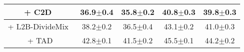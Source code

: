 \begin{table}[ht]
\begin{tabular}{c|cc|cc}
+ C2D~\cite{zheltonozhskii2022contrast}     & \multicolumn{1}{c}{36.9$\pm$0.4}   &35.8$\pm$0.2    & \multicolumn{1}{c}{40.8$\pm$0.3}   & 39.8$\pm$0.3    \\ \midrule
+ L2B-DivideMix~\cite{zhou2024l2b}          & \multicolumn{1}{c}{38.2$\pm$0.2}   &36.5$\pm$0.4    & \multicolumn{1}{c}{43.1$\pm$0.2}   & 41.0$\pm$0.3    \\ \midrule
\rowcolor[HTML]{EFEFEF} + TAD                                        & \multicolumn{1}{c}{42.8$\pm$0.1}   &    41.5$\pm$0.2& \multicolumn{1}{c}{45.5$\pm$0.1}   &    44.2$\pm$0.2\\ 
\bottomrule
\end{tabular}
\label{tab4}
\end{table}
